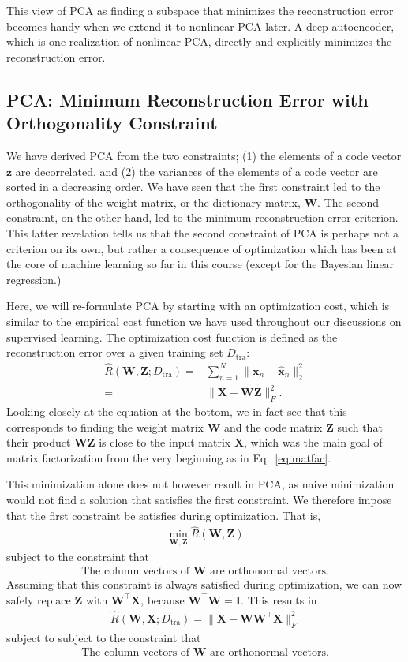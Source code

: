 \documentclass{report}
\newcommand{\vect}[1]{\mathbf{#1}}
\newcommand{\matr}[1]{\mathbf{#1}}
\newcommand{\vx}[0]{\vect{x}}
\newcommand{\vz}[0]{\vect{z}}
\newcommand{\mW}[0]{\matr{W}}
\newcommand{\mZ}[0]{\matr{Z}}
\newcommand{\mX}[0]{\matr{X}}
\newcommand{\mI}{\matr{I}}
\newcommand{\tra}{\text{tra}}
\begin{document}
This view of PCA as finding a subspace that minimizes the reconstruction error
becomes handy when we extend it to nonlinear PCA later. A deep autoencoder,
which is one realization of nonlinear PCA, directly and explicitly minimizes the
reconstruction error.


\subsection{PCA: Minimum Reconstruction Error with Orthogonality Constraint}

We have derived PCA from the two constraints; (1) the elements of a code vector
$\vz$ are decorrelated, and (2) the variances of the elements of a code vector
are sorted in a decreasing order. We have seen that the first constraint led to
the orthogonality of the weight matrix, or the dictionary matrix, $\mW$. The
second constraint, on the other hand, led to the minimum reconstruction error
criterion. This latter revelation tells us that the second constraint of PCA is
perhaps not a criterion on its own, but rather a consequence of optimization
which has been at the core of machine learning so far in this course (except for
the Bayesian linear regression.) 

Here, we will re-formulate PCA by starting with an optimization cost, which
is similar to the empirical cost function we have used throughout our
discussions on supervised learning. The optimization cost function is
defined as the reconstruction error over a given training set $D_{\tra}$:
\begin{align*}
    \hat{R}(\mW, \mZ; D_{\tra}) =& \sum_{n=1}^N \| \vx_n - \hat{\vx}_n
    \|^2_2 \\
    =& \| \mX - \mW \mZ \|_F^2.
\end{align*}
Looking closely at the equation at the bottom, we in fact see that this
corresponds to finding the weight matrix $\mW$ and the code matrix $\mZ$ such
that their product $\mW \mZ$ is close to the input matrix $\mX$, which was the
main goal of matrix factorization from the very beginning as in
Eq.~\eqref{eq:matfac}. 

This minimization alone does not however result in PCA, as naive minimization
would not find a solution that satisfies the first constraint. We therefore
impose that the first constraint be satisfies during optimization. That is, 
\begin{align*}
    \min_{\mW, \mZ} \hat{R}(\mW, \mZ)
\end{align*}
subject to the constraint that
\begin{align*}
    \text{The column vectors of }\mW \text{ are orthonormal vectors}.
\end{align*}
Assuming that this constraint is always satisfied during optimization, we can
now safely replace $\mZ$ with $\mW^\top \mX$, because $\mW^\top \mW = \mI$. This
results in 
\begin{align*}
    \hat{R}(\mW, \mX; D_{\tra}) 
    = \| \mX - \mW \mW^\top \mX \|_F^2
\end{align*}
subject to 
subject to the constraint that
\begin{align*}
    \text{The column vectors of }\mW \text{ are orthonormal vectors}.
\end{align*}
\end{document}
